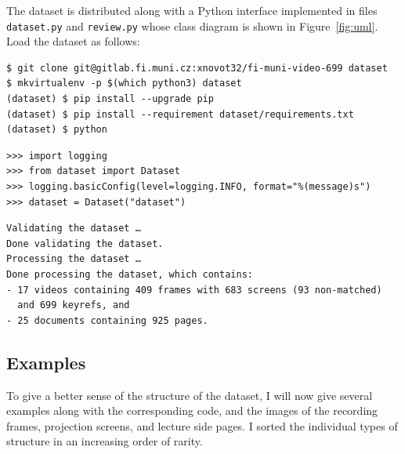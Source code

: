 The dataset is distributed along with a Python interface implemented in files
\texttt{dataset.py} and \texttt{review.py} whose class diagram is shown in
Figure~\ref{fig:uml}. Load the dataset as follows:
\begin{listings}
\begin{verbatim}
$ git clone git@gitlab.fi.muni.cz:xnovot32/fi-muni-video-699 dataset
$ mkvirtualenv -p $(which python3) dataset
(dataset) $ pip install --upgrade pip
(dataset) $ pip install --requirement dataset/requirements.txt
(dataset) $ python
\end{verbatim}
\begin{verbatim}
>>> import logging
>>> from dataset import Dataset
>>> logging.basicConfig(level=logging.INFO, format="%(message)s")
>>> dataset = Dataset("dataset")
\end{verbatim}
\begin{verbatim}
Validating the dataset …
Done validating the dataset.
Processing the dataset …
Done processing the dataset, which contains:
- 17 videos containing 409 frames with 683 screens (93 non-matched)
  and 699 keyrefs, and
- 25 documents containing 925 pages.
\end{verbatim}
\end{listings}

\subsection{Examples}
To give a better sense of the structure of the dataset, I will now give several
examples along with the corresponding  code, and the images of the
recording frames, projection screens, and lecture side pages. I sorted the
individual types of structure in an increasing order of rarity.

